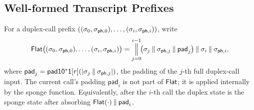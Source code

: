\subsection{Well-formed Transcript Prefixes}
\label{app:wf-transcripts}

For a duplex-call prefix $((\sigma_0, \sigph[0]), \dots, (\sigma_i,
\sigph[i]))$, write
\[
  \Flat\bigl((\sigma_0, \sigph[0]), \dots, (\sigma_i, \sigph[i])\bigr)
  = \bigconcat_{j=0}^{i-1}\!
    \bigl(\sigma_j \concat \sigph[j] \concat \mathsf{pad}_j\bigr)
    \concat \sigma_i \concat \sigph[i],
\]
where $\mathsf{pad}_j = \padtenone[r](|\sigma_j \concat \sigph[j]|)$,
the padding of the $j$-th full duplex-call input.
The current call's padding $\mathsf{pad}_i$ is not part of $\mathsf{Flat}$;
it is applied internally by the sponge function. Equivalently, after
the $i$-th call the duplex state is the sponge state after absorbing
$\mathsf{Flat}(\cdot) \mathbin{\|} \mathsf{pad}_i$.

